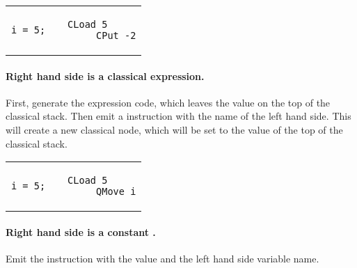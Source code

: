 \begin{center}
\begin{tabular}{p{1in}p{.5in}p{1.5in}}
{\begin{singlespace}
\begin{lstlisting}[style=linqpl]
i = 5;
\end{lstlisting}
\end{singlespace}}
 & { \quad \quad \raisebox{.8em}{$\implies$}} &
{\begin{singlespace}
\begin{lstlisting}[style=linqpl]
     CLoad 5
     CPut -2
\end{lstlisting}
\end{singlespace}}
\end{tabular}
\end{center}


\paragraph{Right hand side is a classical expression.} First, generate the
expression code, which leaves the value on the top of the classical stack.
Then emit a  instruction with the name of the left hand side.
This will create a new classical node, which will be set to the value of the
top of the classical stack.


\begin{center}
\begin{tabular}{p{1in}p{.5in}p{1.5in}}
{\begin{singlespace}
\begin{lstlisting}[style=linqpl]
i = 5;
\end{lstlisting}
\end{singlespace}}
 & { \quad \quad \raisebox{.8em}{$\implies$}} &
{\begin{singlespace}
\begin{lstlisting}[style=linqpl]
     CLoad 5
     QMove i
\end{lstlisting}
\end{singlespace}}
\end{tabular}
\end{center}


\paragraph{Right hand side is a constant \qubit.} Emit the 
 instruction  with the \qubit{} value and the left hand side
variable name.

